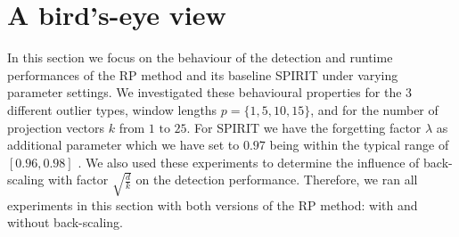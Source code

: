 \section{A bird's-eye view}
\label{sec:analysis_bird}

In this section we focus on the behaviour of the detection and runtime performances of the RP method and its baseline SPIRIT under varying parameter settings. 
We investigated these behavioural properties for the $3$ different outlier types, window lengths $p = \{1,5,10,15\}$, and for the number of projection vectors $k$ from $1 \text{ to } 25$. For SPIRIT we have the forgetting factor $\lambda$ as additional parameter which we have set to $0.97$ being within the typical range of $[0.96, 0.98]$ \cite{papadimitriou2005streaming}. We also used these experiments to determine the influence of back-scaling with factor $\sqrt{\frac{d}{k}}$ on the detection performance. Therefore, we ran all experiments in this section with both versions of the RP method: with and without back-scaling. 

